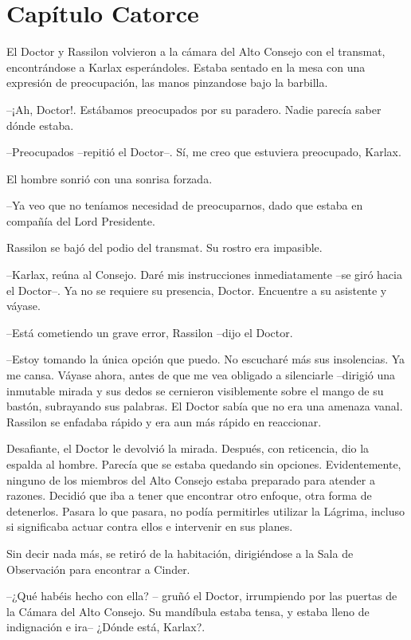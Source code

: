 \chapter*{Capítulo Catorce}

El Doctor y Rassilon volvieron a la cámara del Alto Consejo con el transmat, encontrándose a Karlax esperándoles. Estaba sentado en la mesa con una expresión de preocupación, las manos pinzandose bajo la barbilla.

--¡Ah, Doctor!. Estábamos preocupados por su paradero. Nadie parecía saber dónde estaba.

--Preocupados --repitió el Doctor--. Sí, me creo que estuviera preocupado, Karlax.

El hombre sonrió con una sonrisa forzada. 

--Ya veo que no teníamos necesidad de preocuparnos, dado que estaba en compañía del Lord Presidente.

Rassilon se bajó del podio del transmat. Su rostro era impasible. 

--Karlax, reúna al Consejo. Daré mis instrucciones inmediatamente --se giró hacia el Doctor--. Ya no se requiere su presencia, Doctor. Encuentre a su asistente y váyase.

--Está cometiendo un grave error, Rassilon --dijo el Doctor.

--Estoy tomando la única opción que puedo. No escucharé más sus insolencias. Ya me cansa. Váyase ahora, antes de que me vea obligado a silenciarle --dirigió una inmutable mirada y sus dedos se cernieron visiblemente sobre el mango de su bastón, subrayando sus palabras. El Doctor sabía que no era una amenaza vanal. Rassilon se enfadaba rápido y era aun más rápido en reaccionar.

Desafiante, el Doctor le devolvió la mirada. Después, con reticencia, dio la espalda al hombre. Parecía que se estaba quedando sin opciones. Evidentemente, ninguno de los miembros del Alto Consejo estaba preparado para atender a razones. Decidió que iba a tener que encontrar otro enfoque, otra forma de detenerlos. Pasara lo que pasara, no podía permitirles utilizar la Lágrima, incluso si significaba actuar contra ellos e intervenir en sus planes.

Sin decir nada más, se retiró de la habitación, dirigiéndose a la Sala de Observación para encontrar a Cinder.

--¿Qué habéis hecho con ella? -- gruñó el Doctor, irrumpiendo por las puertas de la Cámara del Alto Consejo. Su mandíbula estaba tensa, y estaba lleno de indignación e ira-- ¿Dónde está, Karlax?.

